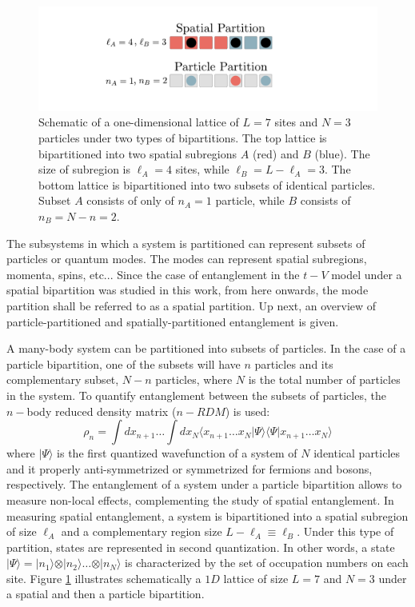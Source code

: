 \begin{figure}[thp]
\begin{center}
\includegraphics[width=1.0\textwidth]{spatialParticle.pdf}
\end{center}
\caption{Schematic of a one-dimensional lattice of $L=7$ sites and $N=3$ particles under two types of bipartitions. The top lattice is bipartitioned into two spatial subregions $A$ (red) and $B$ (blue). The size of subregion is $\ell_A = 4$ sites, while $\ell_B = L - \ell_A = 3$. The bottom lattice is bipartitioned into two subsets of identical particles. Subset $A$ consists of only of $n_A=1$ particle, while $B$ consists of $n_B = N - n = 2$.}
\label{fig:spatialParticle}
\end{figure}

	
	The subsystems in which a system is partitioned can represent subsets of particles or quantum modes. The modes can represent spatial subregions, momenta, spins, etc... Since the case of entanglement in the $t-V$ model under a spatial bipartition was studied in this work, from here onwards, the mode partition shall be referred to as a spatial partition. Up next, an overview of particle-partitioned and spatially-partitioned entanglement is given.

	
	A many-body system can be partitioned into subsets of particles. In the case of a particle bipartition, one of the subsets will have $n$ particles and its complementary subset, $N-n$ particles, where $N$ is the total number of particles in the system. To quantify entanglement between the subsets of particles, the $n-$body reduced density matrix ($n-RDM$) is used:
	\begin{equation}
	\rho_{n} = \int dx_{n+1} \dots \int dx_N \langle x_{n+1} \dots x_N \vert\Psi\rangle \langle\Psi\vert x_{n+1} \dots x_N \rangle
	\label{eq:nBodyDensityMatrix}
	\end{equation}
	where $\vert\Psi\rangle$ is the first quantized wavefunction of a system of $N$ identical particles and it properly anti-symmetrized or symmetrized for fermions and bosons, respectively.  The entanglement of a system under a particle bipartition allows to measure non-local effects, complementing the study of spatial entanglement. 
	In measuring spatial entanglement, a system is bipartitioned into a spatial subregion of size $\ell_{A}$ and a complementary region size $L - \ell_A \equiv \ell_B$. Under this type of partition, states are represented in second quantization. In other words, a state $\vert\Psi\rangle = \vert n_1 \rangle \otimes \vert n_2 \rangle \dots \otimes \vert n_N \rangle$ is characterized by the set of occupation numbers on each site. Figure \ref{fig:spatialParticle} illustrates schematically a $1D$ lattice of size $L = 7$ and $N = 3$ under a spatial and then a particle bipartition.
	
